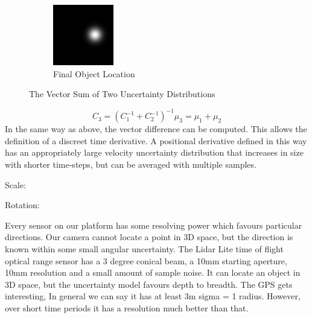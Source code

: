 \documentclass[a4paper, 11pt, titlepage]{article}
\begin{document}
\begin{figure}
      \begin{subfigure}{.3\textwidth}
        \centering
        \includegraphics[width=.8\linewidth]{images/GaussianSum3.png}
        \caption{Final Object Location}
        \label{fig:vectSumsub3}
      \end{subfigure}
      \caption{The Vector Sum of Two Uncertainty Distributions}
      \label{fig:vectSum}
      \end{figure}
      \begin{equation}
      C_3 = (C_1^{-1} + C_2^{-1})^{-1}
      \mu_3 = \mu_1 + \mu_2
      \end{equation}
      In the same way as above, the vector difference can be computed.  This allows the definition of a discreet time derivative.  A positional derivative defined in this way has an appropriately large velocity uncertainty distribution that increases in size with shorter time-steps, but can be averaged with multiple samples.

      Scale:

      Rotation:

      Every sensor on our platform has some resolving power which favours particular directions.
      Our camera cannot locate a point in 3D space, but the direction is known within some small angular uncertainty.
      The Lidar Lite time of flight optical range sensor has a 3 degree conical beam, a 10mm starting aperture, 10mm resolution and a small amount of sample noise. It can locate an object in 3D space, but the uncertainty model favours depth to breadth.
      The GPS gets interesting, In general we can say it has at least 3m sigma = 1 radius. However, over short time periods it has a resolution much better than that.
\end{document}
